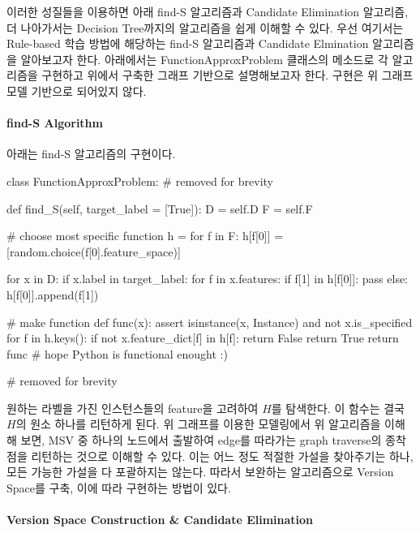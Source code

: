 이러한 성질들을 이용하면 아래 find-S 알고리즘과 Candidate Elimination 알고리즘, 더 나아가서는 Decision Tree까지의 알고리즘을 쉽게 이해할 수 있다. 우선 여기서는 Rule-based 학습 방법에 해당하는 find-S 알고리즘과 Candidate Elmination 알고리즘을 알아보고자 한다. 아래에서는 FunctionApproxProblem 클래스의 메소드로 각 알고리즘을 구현하고 위에서 구축한 그래프 기반으로 설명해보고자 한다. 구현은 위 그래프 모델 기반으로 되어있지 않다. 

\paragraph{find-S Algorithm} 

아래는 find-S 알고리즘의 구현이다. 

\begin{Python}         
class FunctionApproxProblem:
    # removed for brevity
    
    def find_S(self, target_label = [True]):
        D = self.D
        F = self.F
        
        # choose most specific function 
        h = {}
        for f in F:
            h[f[0]] = [random.choice(f[0].feature_space)]
        
        for x in D:
            if x.label in target_label:
                for f in x.features:
                    if f[1] in h[f[0]]:
                        pass
                    else:
                        h[f[0]].append(f[1])
        
        # make function 
        def func(x):    
            assert isinstance(x, Instance) and not x.is_specified
            for f in h.keys():
                if not x.feature_dict[f] in h[f]:
                    return False
            return True
        return func # hope Python is functional enought :) 
        
    # removed for brevity
\end{Python} 

원하는 라벨을 가진 인스턴스들의 feature을 고려하여 $H$를 탐색한다. 이 함수는 결국 $H$의 원소 하나를 리턴하게 된다. 위 그래프를 이용한 모델링에서 위 알고리즘을 이해해 보면, MSV 중 하나의 노드에서 출발하여 edge를 따라가는 graph traverse의 종착점을 리턴하는 것으로 이해할 수 있다. 이는 어느 정도 적절한 가설을 찾아주기는 하나, 모든 가능한 가설을 다 포괄하지는 않는다. 따라서 보완하는 알고리즘으로 Version Space를 구축, 이에 따라 구현하는 방법이 있다. 

\paragraph{Version Space Construction \& Candidate Elimination} 

